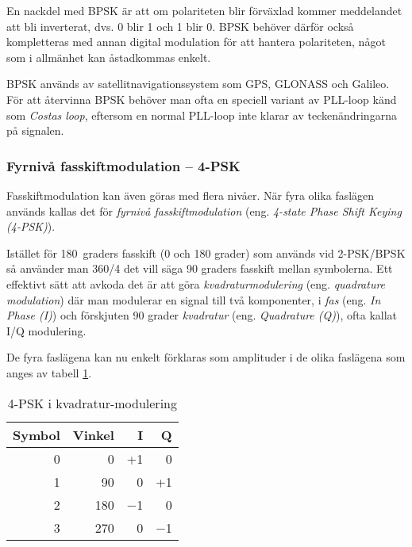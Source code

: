 En nackdel med BPSK är att om polariteten blir förväxlad kommer meddelandet
att bli inverterat, dvs. 0 blir 1 och 1 blir 0. BPSK behöver därför också
kompletteras med annan digital modulation för att hantera polariteten, något
som i allmänhet kan åstadkommas enkelt.

BPSK används av satellitnavigationssystem som GPS, GLONASS och Galileo.
För att återvinna BPSK behöver man ofta en speciell variant av PLL-loop känd
som \emph{Costas loop}, eftersom en normal PLL-loop inte klarar av
teckenändringarna på signalen.

\subsubsection{Fyrnivå fasskiftmodulation -- 4-PSK}

Fasskiftmodulation kan även göras med flera nivåer. När fyra olika faslägen
används kallas det för \emph{fyrnivå fasskiftmodulation} (eng.
\emph{4-state Phase Shift Keying (4-PSK)}).

Istället för 180~graders fasskift (0 och 180 grader) som används vid 2-PSK/BPSK
så använder man 360/4 det vill säga 90 graders fasskift mellan symbolerna.
Ett effektivt sätt att avkoda det är att göra \emph{kvadraturmodulering}
(eng. \emph{quadrature modulation}) där man modulerar en signal till två
komponenter, i \emph{fas} (eng. \emph{In Phase (I)}) och förskjuten 90 grader \emph{kvadratur} (eng.
\emph{Quadrature (Q)}), ofta kallat I/Q modulering.

De fyra faslägena kan nu enkelt förklaras som amplituder i de olika faslägena
som anges av tabell \ref{tab:4-PSK}.

\begin{table}[ht]
\begin{center}
\begin{tabular}{|r|r|r|r|}
\hline
Symbol & Vinkel & I & Q \\ \hline
0 &   0 & +1       &  0 \\
1 &  90 &  0       & +1 \\
2 & 180 & \num{-1} &  0 \\
3 & 270 &  0       & \num{-1} \\ \hline
\end{tabular}
\end{center}
\caption{4-PSK i kvadratur-modulering}
\label{tab:4-PSK}
\end{table}


